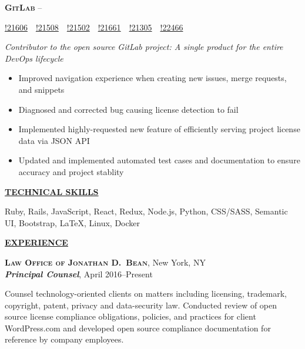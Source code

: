 \documentclass[11pt,letterpaper,english]{article}
\newenvironment{resumelist}[1]
{\begin{list}{}
{\setlength\itemsep{0pt}
\setlength\topsep{0pt}
\setlength\parskip{0pt}
\setlength\parsep{0pt}
\settowidth{\labelwidth}{#1}
 \setlength{\leftmargin}{\labelwidth}
 \addtolength{\leftmargin}{\labelsep}
 \renewcommand{\makelabel}[1]{##1\hfil}}}
{\end{list}}
\begin{document}
\textbf{\textsc{GitLab}} 
--\begin{small}
\href{https://gitlab.com/gitlab-org/gitlab-ce/merge_requests/21606}{!21606}~\color{darkgray}{|}~\href{https://gitlab.com/gitlab-org/gitlab-ce/merge_requests/21508}{!21508}~\color{darkgray}{|}~\href{https://gitlab.com/gitlab-org/gitlab-ce/merge_requests/21502}{!21502}~\color{darkgray}{|}~\href{https://gitlab.com/gitlab-org/gitlab-ce/merge_requests/21661}{!21661}~\color{darkgray}{|}~\href{https://gitlab.com/gitlab-org/gitlab-ce/merge_requests/21305}{!21305}~\color{darkgray}{|}~\href{https://gitlab.com/gitlab-org/gitlab-ce/merge_requests/22466}{!22466}\\
\end{small}
\textit{Contributor to the open source GitLab project: A single product for the entire DevOps lifecycle}
\begin{itemize}
\item Improved navigation experience when creating new issues, merge requests, and snippets
\item Diagnosed and corrected bug causing license detection to fail
\item Implemented highly-requested new feature of efficiently serving project license data via JSON API
\item Updated and implemented automated test cases and documentation to ensure accuracy and project stablity
\end{itemize}
\bigskip

\label{Skills}
\underline{\textbf{\textsc{\large TECHNICAL SKILLS}}}{\large \par}
\smallskip
Ruby, Rails, JavaScript, React, Redux,  Node.js, Python, CSS/SASS, Semantic UI, Bootstrap, \LaTeX, Linux, Docker\bigskip

\label{Experience}
\underline{\textbf{\textsc{\large EXPERIENCE}}}{\large \par}
\smallskip

\textbf{\textsc{Law Office of Jonathan D.\ Bean}}, New York, NY\\\nopagebreak
\textbf{\textit{Principal Counsel}}, April 2016--Present%
\begin{resumelist}{M}
\item    
Counsel technology-oriented clients on matters including licensing, trademark, copyright, patent, privacy and data-security law. Conducted review of open source license compliance obligations, policies, and practices for client WordPress.com and developed open source compliance documentation for reference by company employees.
\end{resumelist}
\smallskip
\end{document}

